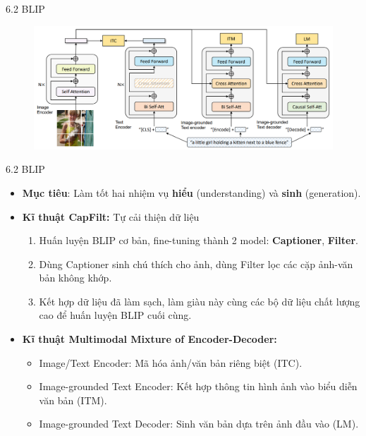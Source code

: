 \begin{frame}{6.2 BLIP}
\begin{figure}
    \centering
    \includegraphics[width=1\linewidth]{img/06-BLIP.png}
\end{figure}
\end{frame}

\begin{frame}{6.2 BLIP}
    \begin{itemize}
        \item \textbf{Mục tiêu}: Làm tốt hai nhiệm vụ \textbf{hiểu} (understanding) và \textbf{sinh} (generation).
        \item \textbf{Kĩ thuật CapFilt:} Tự cải thiện dữ liệu 
        \begin{enumerate}
            \item Huấn luyện BLIP cơ bản, fine-tuning thành 2 model: \textbf{Captioner}, \textbf{Filter}.
            \item Dùng Captioner sinh chú thích cho ảnh, dùng Filter lọc các cặp ảnh-văn bản không khớp.
            \item Kết hợp dữ liệu đã làm sạch, làm giàu này cùng các bộ dữ liệu chất lượng cao để huấn luyện BLIP cuối cùng.
        \end{enumerate}
        \item \textbf{Kĩ thuật Multimodal Mixture of Encoder-Decoder:} 
        \begin{itemize}
            \item Image/Text Encoder: Mã hóa ảnh/văn bản riêng biệt (ITC).
            \item Image-grounded Text Encoder: Kết hợp thông tin hình ảnh vào biểu diễn văn bản (ITM).
            \item Image-grounded Text Decoder: Sinh văn bản dựa trên ảnh đầu vào (LM).
        \end{itemize}
    \end{itemize}
\end{frame}

